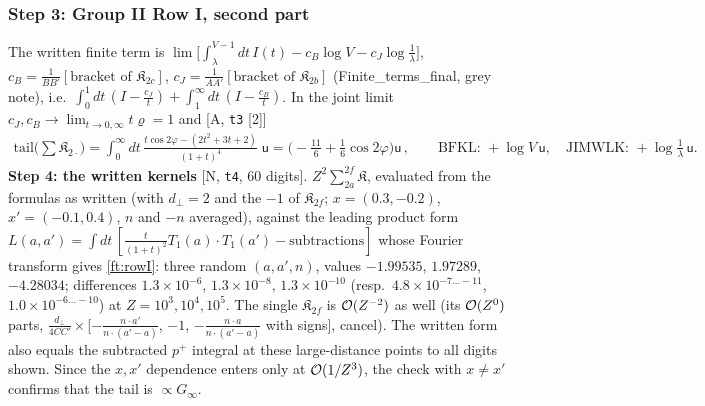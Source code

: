 \documentclass[10pt]{article}
\begin{document}
\subsubsection{Step 3: Group II Row I, second part}
\noindent The written finite term is $\lim\big[\int_{\lambda}^{V-1}dt\,I(t)-c_{B}\log V-c_{J}\log\frac1\lambda\big]$, $c_{B}=\frac{1}{BB'}[\text{bracket of }\mathfrak{K}_{2c}]$, $c_{J}=\frac{1}{AA'}[\text{bracket of }\mathfrak{K}_{2b}]$ (Finite\_terms\_final, grey note), i.e.\ $\int_{0}^{1}dt\,(I-\frac{c_{J}}{t})+\int_{1}^{\infty}dt\,(I-\frac{c_{B}}{t})$. In the joint limit $c_{J},c_{B}\to\lim_{t\to0,\infty}t\varrho=1$ and [A, \texttt{t3} [2]]
\begin{align}
\text{tail}\Big(\sum\mathfrak{K}_{2\cdot}\Big)=\int_{0}^{\infty}dt\,\frac{t\cos2\varphi-(2t^{2}+3t+2)}{(1+t)^{4}}\;\mathsf{u}=\Big(-\frac{11}{6}+\frac16\cos2\varphi\Big)\mathsf{u}\,,\qquad \text{BFKL: }+\log V\,\mathsf{u},\quad\text{JIMWLK: }+\log\tfrac1\lambda\,\mathsf{u}.
\label{ft:rowI}
\end{align}
\textbf{Step 4: the written kernels} [N, \texttt{t4}, 60 digits]. $Z^{2}\sum_{2a}^{2f}\mathfrak{K}$, evaluated from the formulas as written (with $d_{\perp}=2$ and the $-1$ of $\mathfrak{K}_{2f}$; $x=(0.3,-0.2)$, $x'=(-0.1,0.4)$, $n$ and $-n$ averaged), against the leading product form $L(a,a')=\int dt\,[\frac{t}{(1+t)^{2}}T_{1}(a)\!\cdot\!T_{1}(a')-\text{subtractions}]$ whose Fourier transform gives \eqref{ft:rowI}: three random $(a,a',n)$, values $-1.99535$, $1.97289$, $-4.28034$; differences $1.3\times10^{-6},\,1.3\times10^{-8},\,1.3\times10^{-10}$ (resp.\ $4.8\times10^{-7\dots-11}$, $1.0\times10^{-6\dots-10}$) at $Z=10^{3},10^{4},10^{5}$. The single $\mathfrak{K}_{2f}$ is ${\cal O}(Z^{-2})$ as well (its ${\cal O}(Z^{0})$ parts, $\frac{d_{\perp}}{4CC'}\times$[$-\frac{n\cdot a'}{n\cdot(a'-a)}$, $-1$, $-\frac{n\cdot a}{n\cdot(a'-a)}$ with signs], cancel). The written form also equals the subtracted $p^{+}$ integral at these large-distance points to all digits shown. Since the $x,x'$ dependence enters only at ${\cal O}(1/Z^{3})$, the check with $x\ne x'$ confirms that the tail is $\propto G_{\infty}$.
\end{document}
